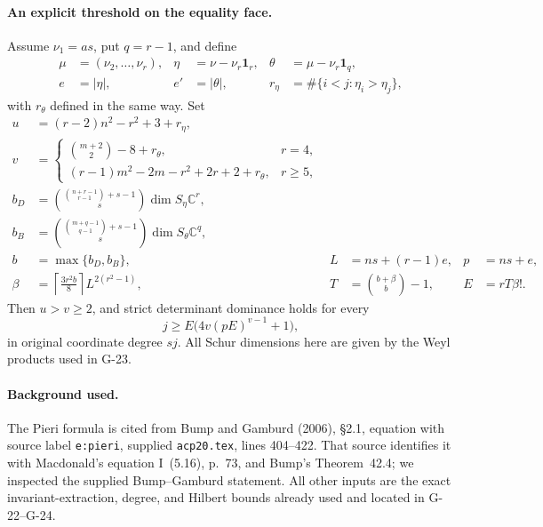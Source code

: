 \paragraph{An explicit threshold on the equality face.}
Assume $\nu_1=as$, put $q=r-1$, and define
\[
 \begin{aligned}
 \mu&=(\nu_2,\ldots,\nu_r),&
 \eta&=\nu-\nu_r\mathbf1_r,&
 \theta&=\mu-\nu_r\mathbf1_q,\\
 e&=|\eta|,&e'&=|\theta|,&
 r_\eta&=\#\{i<j:\eta_i>\eta_j\},
 \end{aligned}
\]
with $r_\theta$ defined in the same way. Set
\[
 \begin{aligned}
 u&=(r-2)n^2-r^2+3+r_\eta,\\
 v&=\begin{cases}
       \binom{m+2}{2}-8+r_\theta,&r=4,\\
       (r-1)m^2-2m-r^2+2r+2+r_\theta,&r\ge5,
      \end{cases}\\
 b_D&=\binom{\binom{n+r-1}{r-1}+s-1}{s}\dim S_\eta\mathbb C^r,\\
 b_B&=\binom{\binom{m+q-1}{q-1}+s-1}{s}\dim S_\theta\mathbb C^q,\\
 b&=\max\{b_D,b_B\},&
 L&=ns+(r-1)e,&p&=ns+e,\\
 \beta&=\left\lceil\frac{3r^2b}{8}\right\rceil L^{2(r^2-1)},&
 T&=\binom{b+\beta}{b}-1,& E&=rT\beta!.
 \end{aligned}
\]
Then $u>v\ge2$, and strict determinant dominance holds for every
\begin{equation}\label{G26:threshold}
                  j\ge E\bigl(4v(pE)^{v-1}+1\bigr),
\end{equation}
in original coordinate degree $sj$. All Schur dimensions here
are given by the Weyl products used in G-23.

\paragraph{Background used.}
The Pieri formula is cited from Bump and Gamburd (2006),
\S2.1, equation with source label \texttt{e:pieri}, supplied
\texttt{acp20.tex}, lines 404--422. That source identifies it
with Macdonald's equation I~(5.16), p.~73, and Bump's
Theorem~42.4; we inspected the supplied Bump--Gamburd statement.
All other inputs are the exact invariant-extraction, degree,
and Hilbert bounds already used and located in G-22--G-24.

